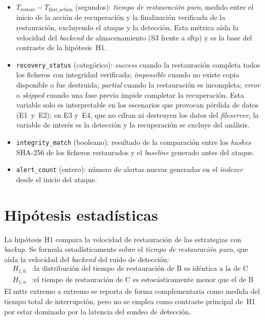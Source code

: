 \documentclass[../main.tex]{subfiles}
\begin{document}
\begin{itemize}
  \item $T_{\text{restore}} - T_{\text{first\_action}}$ (segundos): \emph{tiempo de
  restauración puro}, medido entre el inicio de la acción de recuperación y la
  finalización verificada de la restauración, excluyendo el ataque y la detección.
  Esta métrica aísla la velocidad del \emph{backend} de almacenamiento
  (S3 frente a \gls{sftp}) y es la base del contraste de la hipótesis~H1.

  \item \texttt{recovery\_status} (categórico): \emph{success} cuando la
  restauración completa todos los ficheros con integridad verificada;
  \emph{impossible} cuando no existe copia disponible o fue destruida;
  \emph{partial} cuando la restauración es incompleta; \emph{error} o \emph{skipped}
  cuando una fase previa impide completar la recuperación. Esta variable solo es
  interpretable en los escenarios que provocan pérdida de datos (E1~y~E2); en E3
  y~E4, que no cifran ni destruyen los datos del \emph{fileserver}, la variable de
  interés es la detección y la recuperación se excluye del análisis.

  \item \texttt{integrity\_match} (booleano): resultado de la comparación entre
  los \emph{hashes} SHA-256 de los ficheros restaurados y el \emph{baseline}
  generado antes del ataque.

  \item \texttt{alert\_count} (entero): número de alertas nuevas generadas en el
  \emph{indexer} desde el inicio del ataque.
\end{itemize}

\section{Hipótesis estadísticas}

La hipótesis H1 compara la velocidad de restauración de las estrategias con
\emph{backup}. Se formula estadísticamente sobre el \emph{tiempo de restauración
puro}, que aísla la velocidad del \emph{backend} del ruido de detección:
\begin{align}
  H_{1,0} &: \text{la distribución del tiempo de restauración de B es idéntica a la de C} \\
  H_{1,a} &: \text{el tiempo de restauración de C es estocásticamente menor que el de B}
\end{align}
El \gls{mttr} extremo a extremo se reporta de forma complementaria como medida del
tiempo total de interrupción, pero no se emplea como contraste principal de~H1 por
estar dominado por la latencia del sondeo de detección.
\end{document}
